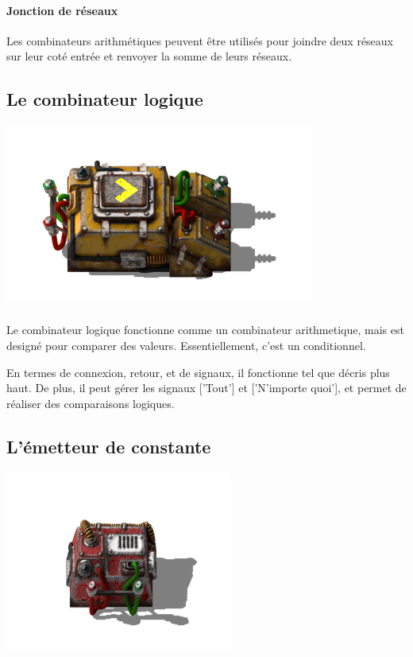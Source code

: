 \documentclass{scrreprt}
\begin{document}
	\paragraph{Jonction de réseaux}
	Les combinateurs arithmétiques peuvent être utilisés pour joindre deux réseaux sur leur coté entrée et renvoyer la somme de leurs réseaux.
	
	\subsection{Le combinateur logique}
	\begin{minipage}[t]{\textwidth}
		
		{
			\centering
			\includegraphics{pics/factorio-decider.png}
		}
		
	\end{minipage} 
	
	\paragraph{}
	Le combinateur logique fonctionne comme un combinateur arithmetique, mais est designé pour comparer des valeurs.
	Essentiellement, c'est un conditionnel.
	
	En termes de connexion, retour, et de signaux, il fonctionne tel que décris plus haut. De plus, il peut gérer les signaux ['Tout'] et ['N'importe quoi'], et permet de réaliser des comparaisons logiques. 
	
	\subsection{L'émetteur de constante}
	\begin{minipage}[t]{\textwidth}
		
		
		{
			\centering
			\includegraphics{pics/factorio-constant.png}
		}
		
	\end{minipage}
	
\end{document}
